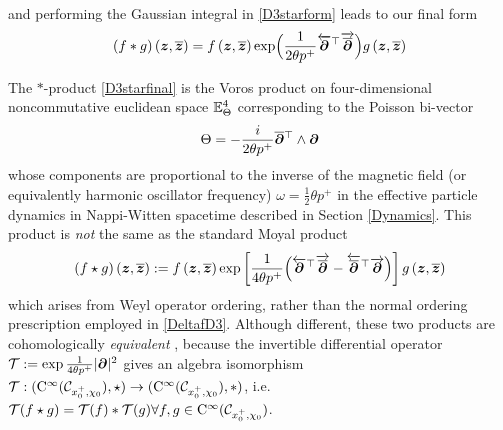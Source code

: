 and performing the Gaussian integral in \eqref{D3starform} leads to our final
form
\begin{equation}
  \label{D3starfinal}
  (f*g)\left({{\boldsymbol {z} }},\overline{{{\boldsymbol {z} }}} \right)=f\left({{\boldsymbol {z} }},
    \overline{{{\boldsymbol {z} }}} \right) \exp\Bigl(\frac1{2\theta p^+}
  \overleftarrow{{{\boldsymbol {\partial} }}}{}^{ \top} \overrightarrow{\overline{{{\boldsymbol {\partial} }}}}
  \Bigr) g\left({{\boldsymbol {z} }},\overline{{{\boldsymbol {z} }}} \right)
\end{equation}

The $\ast$-product \eqref{D3starfinal} is the Voros product \cite{Voros1} on
four-dimensional noncommutative euclidean space ${\mathbb E}_\Theta^4$ corresponding
to the Poisson bi-vector
\begin{equation}
  \label{NCparD3}
  \Theta=-\frac i{2\theta p^+} \overline{{{\boldsymbol {\partial} }}}{}^{ \top}
  \wedge{{\boldsymbol {\partial} }}
\end{equation}
whose components are proportional to the inverse of the magnetic field (or
equivalently harmonic oscillator frequency) $\omega=\frac12 \theta p^+$ in the
effective particle dynamics in Nappi-Witten spacetime described in Section
\ref{Dynamics}. This product is {\it not} the same as the standard Moyal product
\begin{equation}
  \label{MoyalD3def}
  (f\star g)\left({{\boldsymbol {z} }},\overline{{{\boldsymbol {z} }}} \right):=f\left({{\boldsymbol {z} }},
    \overline{{{\boldsymbol {z} }}} \right) \exp\left[\frac1{4\theta p^+}
    \Bigl(\overleftarrow{{{\boldsymbol {\partial} }}}{}^{ \top} \overrightarrow{\overline{{{\boldsymbol {\partial} }}}}
    -\overleftarrow{\overline{{{\boldsymbol {\partial} }}}}{}^{ \top} 
    \overrightarrow{{{\boldsymbol {\partial} }}} \Bigr)\right] g\left({{\boldsymbol {z} }},\overline{{{\boldsymbol {z} }}} \right)
\end{equation}
which arises from Weyl operator ordering, rather than the normal ordering
prescription employed in \eqref{DeltafD3}. Although different, these two
products are cohomologically {\it equivalent} \cite{Voros1}, because the
invertible differential operator $\mathcal{T}:=\exp\frac1{4\theta p^+} |{{\boldsymbol {\partial} }}|^2$
gives an algebra isomorphism $\mathcal{T}:({\rm
  C}^\infty(\mathcal{C}_{x_0^+,\chi_0}) , \star)\to({\rm
  C}^\infty(\mathcal{C}_{x_0^+,\chi_0}) , *)$, i.e. $\mathcal{T}(f\star
g)=\mathcal{T}(f)*\mathcal{T}(g) \forall f,g\in{\rm
  C}^\infty(\mathcal{C}_{x_0^+,\chi_0})$.

